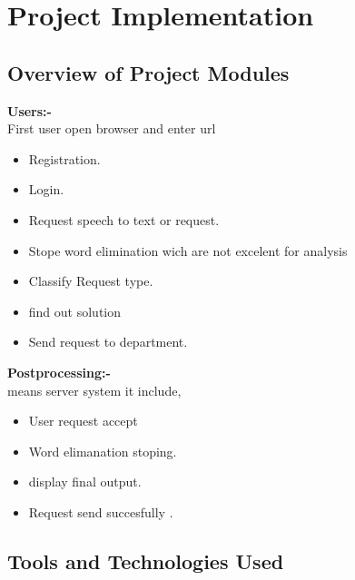 \section{Project Implementation}

\subsection{Overview of Project Modules}
\textbf{Users:-}\\
First user open browser and enter url
\begin{itemize}
	\item  Registration.
	\item Login.
	\item Request speech to text or request.
	\item Stope word elimination wich are not excelent for analysis 
	\item Classify Request type.
	\item find out solution
	\item Send request to department.
	
\end{itemize}
\textbf{Postprocessing:-}\\
 means server system it include,
\begin{itemize}
	\item User request accept 
	\item Word elimanation stoping.
	\item display final output.
	\item Request send succesfully .


\end{itemize}

\subsection{Tools and Technologies Used }

